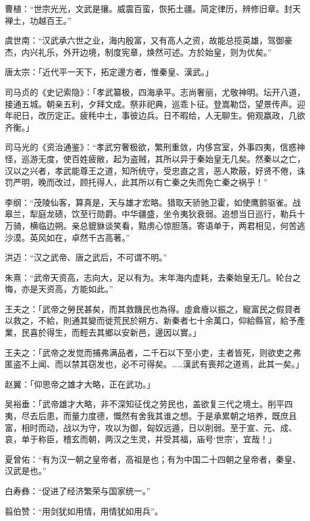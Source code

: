 曹植：“世宗光光，文武是攘。威震百蛮，恢拓土疆。简定律历，辨修旧章。封天禅土，功越百王。”

虞世南：“汉武承六世之业，海内殷富，又有高人之资，故能总揽英雄，驾御豪杰，内兴礼乐，外开边境，制度宪章，焕然可述。方於始皇，则为优矣。”

唐太宗：「近代平一天下，拓定邊方者，惟秦皇、漢武。」

司马贞的《史记索隐》：「孝武纂极，四海承平。志尚奢丽，尤敬神明。坛开八道，接通五城。朝亲五利，夕拜文成。祭非祀典，巡乖卜征。登嵩勒岱，望景传声。迎年祀日，改历定正。疲秏中土，事彼边兵。日不暇给，人无聊生。俯观嬴政，几欲齐衡。」

司马光的《资治通鉴》：“孝武穷奢极欲，繁刑重敛，内侈宫室，外事四夷，信惑神怪，巡游无度，使百姓疲敝，起为盗贼，其所以异于秦始皇无几矣。然秦以之亡，汉以之兴者，孝武能尊王之道，知所统守，受忠直之言，恶人欺蔽，好贤不倦，诛罚严明，晚而改过，顾托得人，此其所以有亡秦之失而免亡秦之祸乎！”

李纲：“茂陵仙客，算真是，天与雄才宏略。猎取天骄驰卫霍，如使鹰鹯驱雀。战皋兰，犁庭龙碛，饮至行勋爵。中华疆盛，坐令夷狄衰弱。追想当日巡行，勒兵十万骑，横临边朔。亲总貔貅谈笑看，黠虏心惊胆落。寄语单于，两君相见，何苦逃沙漠。英风如在，卓然千古高著。”

洪迈：“汉之武帝、唐之武后，不可谓不明。”

朱熹：“武帝天资高，志向大，足以有为。末年海内虚耗，去秦始皇无几。轮台之悔，亦是天资高，方能如此。”

王夫之：「武帝之勞民甚矣，而其救饑民也為得。虛倉廥以振之，寵富民之假貸者以救之，不給，則通其變而徙荒民於朔方、新秦者七十余萬口，仰給縣官，給予產業，民喜於得生，而輕去其鄉以安新邑，邊因以實。」

王夫之：「武帝之发觉而捕弗满品者，二千石以下至小吏，主者皆死，则欲吏之弗匿盗不上闻、而以禁其窃发也，必不可得矣。……漢武有喪邦之道焉，此其一矣。」

赵翼：「仰思帝之雄才大略，正在武功。」

吴裕垂：「武帝雄才大略，非不深知征伐之劳民也，盖欲复三代之境土。削平四夷，尽去后患，而量力度德，慨然有舍我其谁之想。于是承累朝之培养，既庶且富，相时而动，战以为守，攻以为御，匈奴远遁，日以削弱。至于宣、元、成、哀，单于称臣，稽玄而朝，两汉之生灵，并受其福，庙号‘世宗’，宜哉！」

夏曾佑：“有为汉一朝之皇帝者，高祖是也；有为中国二十四朝之皇帝者，秦皇、汉武是也。”

白寿彝：“促进了经济繁荣与国家统一。”

翦伯赞：“用剑犹如用情，用情犹如用兵”。

